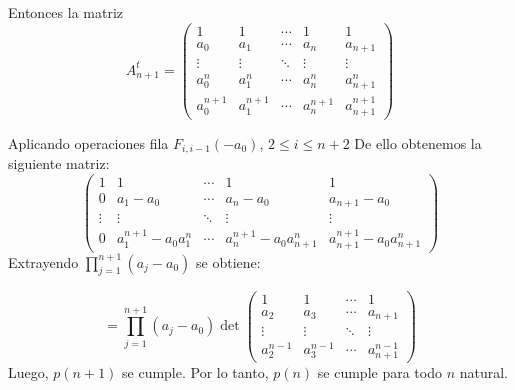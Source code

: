 \begin{frame}
\begin{solution}
\begin{itemize}
			      Entonces la matriz
			      \begin{equation*}
				      A^{t}_{n+1}=
				      \begin{pmatrix}
					      1         & 1         & \cdots & 1           & 1             \\
					      a_0       & a_1       & \cdots & a_{n}       & a_{n+1}       \\
					      \vdots    & \vdots    & \ddots & \vdots      & \vdots        \\
					      a_0^{n}   & a_1^{n}   & \cdots & a_{n}^{n}   & a_{n+1}^{n}   \\
					      a_0^{n+1} & a_1^{n+1} & \cdots & a_{n}^{n+1} & a_{n+1}^{n+1}
				      \end{pmatrix}
			      \end{equation*}

		\end{itemize}
	\end{solution}
\end{frame}

\begin{frame}
	Aplicando operaciones fila $F_{i,i-1}(-a_{0})$, $2\leq i\leq n+2$
	De ello obtenemos la siguiente matriz:
	$$\begin{pmatrix} 1&1&\cdots & 1 &1\\   0&a_1-a_0&\cdots &a_n-a_0&a_{n+1}-a_0\\   \vdots&\vdots&\ddots&\vdots&\vdots\\   0&a_1^{n+1}-a_0a_{1}^{n}&\cdots&a_{n}^{n+1}-a_0a_{n+1}^{n}& a_{n+1}^{n+1}-a_0a_{n+1}^{n}\end{pmatrix}$$
	Extrayendo $\prod_{j=1}^{n+1}(a_j-a_0)$ se obtiene:

	$$=\prod_{j=1}^{n+1}(a_j-a_0) \det\begin{pmatrix} 1& 1&\cdots&1\\a_2&a_3&\cdots&a_{n+1}\\ \vdots&\vdots&\ddots&\vdots\\a_2^{n-1}&a_3^{n-1}&\cdots&a_{n+1}^{n-1}\end{pmatrix}$$
	Luego, $p\left(n+1\right)$ se cumple.
	Por lo tanto, $p\left(n\right)$ se cumple para todo $n$ natural.

\end{frame}

